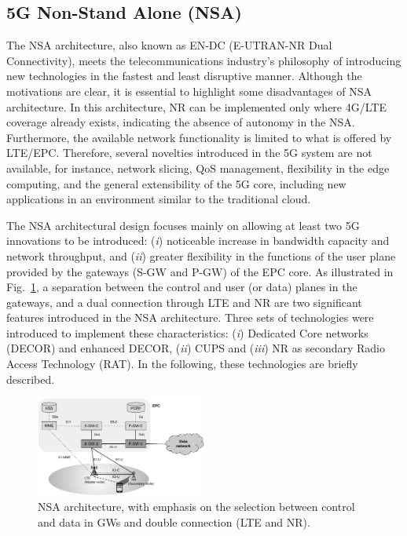\subsection{5G Non-Stand Alone (NSA)}\label{sec:NSA}

The NSA architecture, also known as EN-DC (E-UTRAN-NR Dual Connectivity), meets the telecommunications industry's philosophy of introducing new technologies in the fastest and least disruptive manner. Although the motivations are clear, it is essential to highlight some disadvantages of NSA architecture. In this architecture, NR can be implemented only where 4G/LTE coverage already exists, indicating the absence of autonomy in the NSA. Furthermore, the available network functionality is limited to what is offered by LTE/EPC. Therefore, several novelties introduced in the 5G system are not available, for instance, network slicing, QoS management, flexibility in the edge computing, and the general extensibility of the 5G core, including new applications in an environment similar to the traditional cloud.

The NSA architectural design focuses mainly on allowing at least two 5G innovations to be introduced: (\textit{i}) noticeable increase in bandwidth capacity and network throughput, and (\textit{ii}) greater flexibility in the functions of the user plane provided by the gateways (S-GW and P-GW) of the EPC core. As illustrated in Fig.~\ref{fig:arq_NSA}, a separation between the control and user (or data) planes in the gateways, and a dual connection through LTE and NR are two significant features introduced in the NSA architecture. Three sets of technologies were introduced to implement these characteristics: (\textit{i}) Dedicated Core networks (DECOR) and enhanced DECOR, (\textit{ii}) CUPS and (\textit {iii}) NR as secondary Radio Access Technology (RAT). In the following, these technologies are briefly described.

 \begin{figure}[htb]  
  \begin{center}
 \includegraphics[width=0.5\textwidth]{figs/arquitetura_NSA.pdf}
   \end{center}
 \caption{NSA architecture, with emphasis on the selection between control and data in GWs and double connection (LTE and NR).}
 \label{fig:arq_NSA}
 \end{figure}


